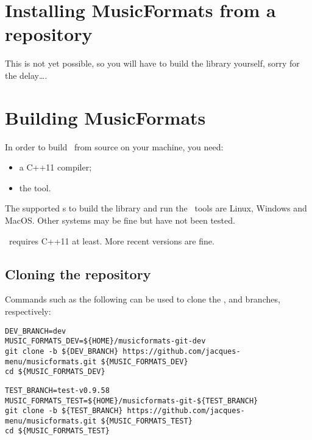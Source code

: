 
\chapter{Installing MusicFormats from a repository}

This is not yet possible, so you will have to build the library yourself, sorry for the delay\dots.


\chapter{Building MusicFormats}

In order to build \mf\ from source on your machine, you need:
\begin{itemize}
\item a C++11 compiler;
\item the  tool.
\end{itemize}

The supported \OS s to build the library and run the \CLI\ tools are Linux, Windows and MacOS. Other systems may be fine but have not been tested.

\mf\ requires C++11 at least. More recent versions are fine.


\section{Cloning the repository}

Commands such as the following can be used to clone the ,  and  branches, respectively:

\begin{lstlisting}[language=Terminal]
DEV_BRANCH=dev
MUSIC_FORMATS_DEV=${HOME}/musicformats-git-dev
git clone -b ${DEV_BRANCH} https://github.com/jacques-menu/musicformats.git ${MUSIC_FORMATS_DEV}
cd ${MUSIC_FORMATS_DEV}
\end{lstlisting}

\begin{lstlisting}[language=Terminal]
TEST_BRANCH=test-v0.9.58
MUSIC_FORMATS_TEST=${HOME}/musicformats-git-${TEST_BRANCH}
git clone -b ${TEST_BRANCH} https://github.com/jacques-menu/musicformats.git ${MUSIC_FORMATS_TEST}
cd ${MUSIC_FORMATS_TEST}
\end{lstlisting}

